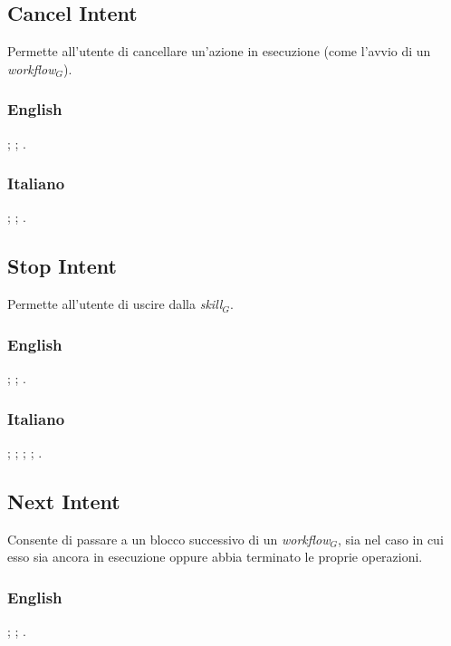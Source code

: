 \subsection{Cancel Intent}
Permette all'utente di cancellare un'azione in esecuzione (come l'avvio di un \textit{workflow$_{G}$}).
\subsubsection{English}
\begin{itemize}
	;
	;
	.
\end{itemize}

\subsubsection{Italiano}
\begin{itemize}
	;
	;
	.
\end{itemize}

\subsection{Stop Intent}
Permette all'utente di uscire dalla \textit{skill$_{G}$}.
\subsubsection{English}
\begin{itemize}	
	;
	;
	.
\end{itemize}

\subsubsection{Italiano}

\begin{itemize}
	;
	;
	;
	;
	.
\end{itemize}


\subsection{Next Intent}
Consente di passare a un blocco successivo di un \textit{workflow$_{G}$}, sia nel caso in cui esso sia ancora in esecuzione oppure abbia terminato le proprie operazioni. 
\subsubsection{English}
\begin{itemize}
	;
	;
	.	
\end{itemize}


